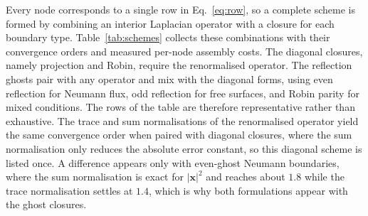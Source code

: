 \documentclass[preprint,review,12pt]{elsarticle}
\begin{document}
Every node corresponds to a single row in Eq.~\eqref{eq:row}, so a complete scheme is formed by combining an interior Laplacian operator with a closure for each boundary type.
Table~\ref{tab:schemes} collects these combinations with their convergence orders and measured per-node assembly costs.
The diagonal closures, namely projection and Robin, require the renormalised operator.
The reflection ghosts pair with any operator and mix with the diagonal forms, using even reflection for Neumann flux, odd reflection for free surfaces, and Robin parity for mixed conditions.
The rows of the table are therefore representative rather than exhaustive.
The trace and sum normalisations of the renormalised operator yield the same convergence order when paired with diagonal closures, where the sum normalisation only reduces the absolute error constant, so this diagonal scheme is listed once.
A difference appears only with even-ghost Neumann boundaries, where the sum normalisation is exact for $|\mathbf x|^2$ and reaches about $1.8$ while the trace normalisation settles at $1.4$, which is why both formulations appear with the ghost closures.

\begin{table}[t]
  \centering
  \caption{Summary of numerical schemes showing their boundary closures, convergence rates, and per-node assembly cost measured at the finest resolution of the timing study in Section~\ref{sec:cost}.}
  \label{tab:schemes}
\end{table}
\end{document}
